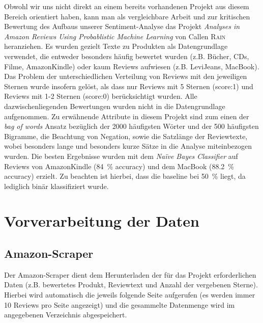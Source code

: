 \documentclass[a4paper]{article}
\begin{document}
Obwohl wir uns nicht direkt an einem bereits vorhandenen Projekt aus diesem Bereich orientiert haben, kann man als vergleichbare Arbeit und zur kritischen Bewertung des Aufbaus unserer Sentiment-Analyse das Projekt \emph{Analyses in Amazon Reviews Using Probablistic Machine Learning} von Callen \textsc{Rain} heranziehen. 
Es wurden gezielt Texte zu Produkten als Datengrundlage verwendet, die entweder besonders häufig bewertet wurden (z.B. Bücher, CDs, Filme, AmazonKindle) oder kaum Reviews aufwiesen (z.B. LeviJeans, MacBook). Das Problem der unterschiedlichen Verteilung von Reviews mit den jeweiligen Sternen wurde insofern gelöst, als dass nur Reviews mit 5 Sternen (score:1) und Reviews mit 1-2 Sternen (score:0) berücksichtigt wurden. Alle dazwischenliegenden Bewertungen wurden nicht in die Datengrundlage aufgenommen. Zu erwähnende Attribute in diesem Projekt sind zum einen der \emph{bag of words} Ansatz bezüglich der 2000 häufigsten Wörter und der 500 häufigsten Bigramme, die Beachtung von Negation, sowie die Satzlänge der Reviewtexte, wobei besonders lange und besonders kurze Sätze in die Analyse miteinbezogen wurden. Die besten Ergebnisse wurden mit dem \emph{Naïve Bayes Classifier} auf Reviews von AmazonKindle (\SI{84}{\%} accuracy) und dem MacBook (\SI{88.2}{\%} accuracy) erzielt. Zu beachten ist hierbei, dass die baseline bei \SI{50}{\%} liegt, da lediglich binär klassifiziert wurde.  


\section{Vorverarbeitung der Daten}




\subsection{Amazon-Scraper}

Der Amazon-Scraper dient dem Herunterladen der für das Projekt erforderlichen Daten (z.B. bewertetes Produkt, Reviewtext und Anzahl der vergebenen Sterne). Hierbei wird automatisch die jeweils folgende Seite aufgerufen (es werden immer 10 Reviews pro Seite angezeigt) und die gesammelte Datenmenge wird im angegebenen Verzeichnis abgespeichert.
\end{document}
